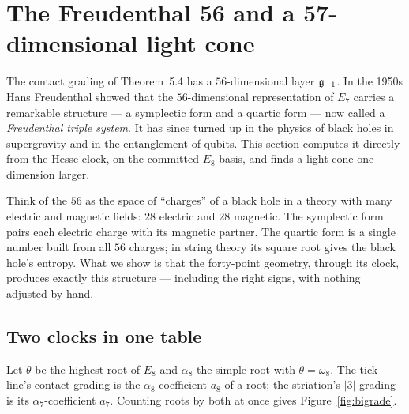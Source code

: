 \section{The Freudenthal 56 and a 57-dimensional light cone}
\label{sec:fts}

The contact grading of Theorem~5.4 has a $56$-dimensional layer $\mathfrak{g}_{-1}$. In the 1950s
Hans Freudenthal showed \cite{Freudenthal} that the $56$-dimensional representation of $E_7$ carries a
remarkable structure --- a symplectic form and a quartic form --- now called a
\emph{Freudenthal triple system}. It has since turned up in the physics of black holes in
supergravity and in the entanglement of qubits. This section computes it directly from the
Hesse clock, on the committed $E_8$ basis, and finds a light cone one dimension larger.

\begin{plainwords}
Think of the $56$ as the space of ``charges'' of a black hole in a theory with many
electric and magnetic fields: $28$ electric and $28$ magnetic. The symplectic form pairs
each electric charge with its magnetic partner. The quartic form is a single number built
from all $56$ charges; in string theory its square root gives the black hole's entropy.
What we show is that the forty-point geometry, through its clock, produces exactly this
structure --- including the right signs, with nothing adjusted by hand.
\end{plainwords}

\subsection{Two clocks in one table}

Let $\theta$ be the highest root of $E_8$ and $\alpha_8$ the simple root with
$\theta=\omega_8$. The tick line's contact grading is the $\alpha_8$-coefficient $a_8$ of
a root; the striation's $|3|$-grading is its $\alpha_7$-coefficient $a_7$. Counting
roots by both at once gives Figure~\ref{fig:bigrade}.

